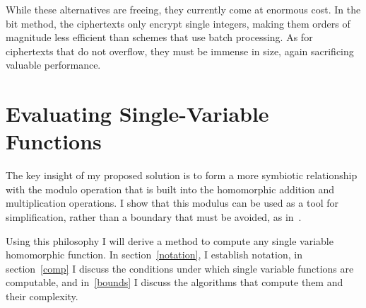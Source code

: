 \documentclass{article}
\begin{document}
        While these alternatives are freeing, they currently come at enormous cost.
        In the bit method, the ciphertexts only encrypt single integers,
        making them orders of magnitude less efficient than schemes that use batch processing.
        As for ciphertexts that do not overflow, they must be immense in size, again sacrificing valuable performance.


    \section{Evaluating Single-Variable Functions}
    \label{high}

        The key insight of my proposed solution is to form
        a more symbiotic relationship with the modulo operation that is built
        into the homomorphic addition and multiplication operations.
        I show that this modulus can be used as a tool for simplification, rather than a boundary that must be avoided, as in~\cite{newton, fixedpoint}.

        Using this philosophy I will derive a method to compute any single variable homomorphic function. 
        In section~\ref{notation}, I establish notation,
        in section~\ref{comp} I discuss the conditions under which single variable functions are computable,
        and in~\ref{bounds} I discuss the algorithms that compute them and their complexity.

\end{document}
